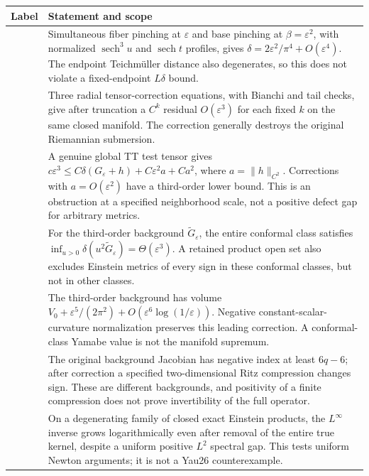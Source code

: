 \documentclass[a4paper,11pt]{article}
\numberwithin{equation}{section}
\theoremstyle{definition}
\begin{document}
\begin{longtable}{L{.23\textwidth}L{.65\textwidth}}
\toprule Label & Statement and scope\\\midrule\endhead
{} & Simultaneous fiber pinching at $\varepsilon$ and base pinching at $\beta=\varepsilon^2$, with normalized $\operatorname{sech}^3u$ and $\operatorname{sech}t$ profiles, gives $\delta=2\varepsilon^2/\pi^4+O(\varepsilon^4)$. The endpoint Teichm\"uller distance also degenerates, so this does not violate a fixed-endpoint $L\delta$ bound.\\
 & Three radial tensor-correction equations, with Bianchi and tail checks, give after truncation a $C^k$ residual $O(\varepsilon^3)$ for each fixed $k$ on the same closed manifold. The correction generally destroys the original Riemannian submersion.\\
 & A genuine global TT test tensor gives $c\varepsilon^3\le C\delta(G_\varepsilon+h)+C\varepsilon^2a+Ca^2$, where $a=\|h\|_{C^2}$. Corrections with $a=O(\varepsilon^2)$ have a third-order lower bound. This is an obstruction at a specified neighborhood scale, not a positive defect gap for arbitrary metrics.\\
 & For the third-order background $\widetilde G_\varepsilon$, the entire conformal class satisfies $\inf_{u>0}\delta(u^2\widetilde G_\varepsilon)=\Theta(\varepsilon^3)$. A retained product open set also excludes Einstein metrics of every sign in these conformal classes, but not in other classes.\\
 & The third-order background has volume $V_0+\varepsilon^5/(2\pi^2)+O(\varepsilon^6\log(1/\varepsilon))$. Negative constant-scalar-curvature normalization preserves this leading correction. A conformal-class Yamabe value is not the manifold supremum.\\
 & The original background Jacobian has negative index at least $6q-6$; after correction a specified two-dimensional Ritz compression changes sign. These are different backgrounds, and positivity of a finite compression does not prove invertibility of the full operator.\\
 & On a degenerating family of closed exact Einstein products, the $L^\infty$ inverse grows logarithmically even after removal of the entire true kernel, despite a uniform positive $L^2$ spectral gap. This tests uniform Newton arguments; it is not a Yau26 counterexample.\\\bottomrule
\end{longtable}
\end{document}
